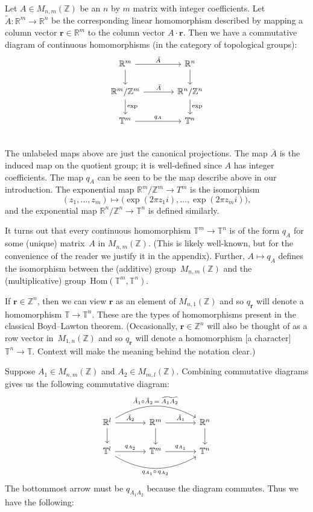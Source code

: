 \documentclass[12pt]{amsart}
\theoremstyle{plain}
\theoremstyle{definition}
\theoremstyle{remark}
\numberwithin{theorem}{section}
\numberwithin{equation}{section} %
\newcommand{\bZ}{{\mathbb{Z}}}
\newcommand{\bR}{{\mathbb{R}}}
\newcommand{\mb}{\mathbf}
\newcommand{\torus}{{\mathbb{T}}}
\begin{document}
Let $A \in M_{n, m}(\bZ)$
be an $n$ by $m$ matrix with integer coefficients. Let $\tilde A \colon \bR^m \to \bR^n$
be the corresponding linear homomorphism described by mapping a column vector $\mb r \in \bR^m$
to the column vector $A \cdot \mb r$. Then we have a commutative diagram
of continuous
homomorphisms (in the category of topological groups):
 $$
 \begin{tikzcd} [column sep = large]
\bR^m  \arrow[r, "\tilde A"]  \arrow[d] & \bR^n \arrow[d]    \\
\bR^m/\bZ^m  \arrow[r, "\bar A"]  \arrow[d, "\mathrm{exp}"] & \bR^n/\bZ^n  \arrow[d, "\mathrm{exp}"]   \\
\torus^m  \arrow[r,  "q_A"]  & \torus^n    \\
\end{tikzcd}
$$
The unlabeled maps above are just the canonical projections.  The map $\overline A$ is the induced
map on the quotient group; it is well-defined since $A$ has integer coefficients.
The map $q_A$ can be seen to be the map describe above in our introduction.
The exponential map $\bR^m / \bZ^m \to T^m$ is the isomorphism 
$$
(z_1, \ldots, z_m) \mapsto \big( \exp(2 \pi z_1 i), \ldots, \exp(2 \pi z_m i) \big),
$$
and the exponential map $\bR^n / \bZ^n \to \torus^n$ is defined similarly.

It turns out that every continuous homomorphism $\torus^m \to \torus^n$ is of the form $q_A$
for some (unique) matrix~$A$ in $M_{n, m}(\bZ)$.
(This is likely well-known, but for the convenience
of the reader we justify it in the appendix).
Further, $A \mapsto q_A$ defines the isomorphism between the (additive) group~$M_{n,m}(\bZ)$ and
the (multiplicative) group~$\mathrm{Hom}(\torus^m, \torus^n)$.



If $\mb r \in \bZ^n$, then we can view $\mb r$ as an element of $M_{n, 1}(\bZ)$
and so $q_{\mb r}$ will denote a homomorphism $\torus \to \torus^n$. These are the types
of homomorphisms present in the classical Boyd--Lawton theorem. (Occasionally, 
$\mb r \in \bZ^n$ will also be thought of as a row vector in~$M_{1, n}(\bZ)$
and so $q_{\mb r}$ will denote a homomorphism [a character] $\torus^n \to \torus$.
Context will make the meaning behind the notation clear.) %

Suppose $A_1 \in M_{n, m}(\bZ)$ and $A_2 \in M_{m, l}(\bZ)$.
Combining commutative diagrams gives us the following commutative diagram:
 $$
 \begin{tikzcd} [column sep = large]
\bR^l \arrow[r, "\tilde A_2"] \arrow[d] 
     \arrow[rr, bend left, "\tilde A_1 \circ \tilde A_2 \, =\;    \widetilde{A_1 A_2}"]  
        & \bR^m  \arrow[r, "\tilde A_1"]  \arrow[d] & \bR^n \arrow[d]    \\
\torus^l  \arrow[r,  "q_{A_2}"] \arrow[rr, swap, bend right, "q_{A_1} \circ\,  q_{A_2}"]  & 
\torus^m  \arrow[r,  "q_{A_1}"]  & \torus^n    \\
\end{tikzcd}
$$
The bottommost arrow must be $q_{A_1 A_2}$ because the diagram commutes.
Thus we have the following:
\end{document}
